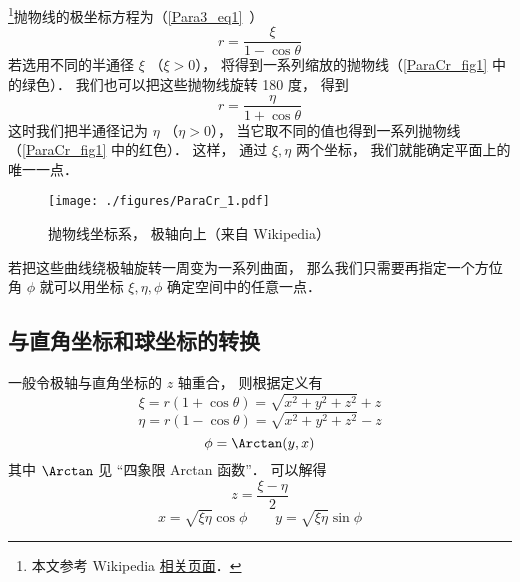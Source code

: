 
\begin{issues}
\issueTODO
\end{issues}


\footnote{本文参考 Wikipedia \href{https://en.wikipedia.org/wiki/Parabolic_coordinates}{相关页面}．}抛物线的极坐标方程为（\autoref{Para3_eq1}~）
\begin{equation}\label{ParaCr_eq1}
r = \frac{\xi}{1 - \cos \theta }
\end{equation}
若选用不同的半通径 $\xi$ （$\xi > 0$）， 将得到一系列缩放的抛物线（\autoref{ParaCr_fig1} 中的绿色）． 我们也可以把这些抛物线旋转 180 度， 得到
\begin{equation}
r = \frac{\eta}{1 + \cos \theta }
\end{equation}
这时我们把半通径记为 $\eta$ （$\eta > 0$）， 当它取不同的值也得到一系列抛物线（\autoref{ParaCr_fig1} 中的红色）． 这样， 通过 $\xi, \eta$ 两个坐标， 我们就能确定平面上的唯一一点．

\begin{figure}[ht]
\centering
\texttt{[image: ./figures/ParaCr\_1.pdf]}
\caption{抛物线坐标系， 极轴向上（来自 Wikipedia）} \label{ParaCr_fig1}
\end{figure}

若把这些曲线绕极轴旋转一周变为一系列曲面， 那么我们只需要再指定一个方位角 $\phi$ 就可以用坐标 $\xi, \eta, \phi$ 确定空间中的任意一点．

\subsection{与直角坐标和球坐标的转换}
一般令极轴与直角坐标的 $z$ 轴重合， 则根据定义有
\begin{equation}
\xi = r(1 + \cos\theta) = \sqrt{x^2 + y^2 + z^2} + z
\end{equation}
\begin{equation}
\eta = r(1 - \cos\theta) = \sqrt{x^2 + y^2 + z^2} - z
\end{equation}
\begin{equation}
\phi = \Arctan(y, x)
\end{equation}
其中 $\Arctan$ 见 “四象限 Arctan 函数”． 可以解得
\begin{equation}\label{ParaCr_eq2}
z = \frac{\xi - \eta}{2}
\end{equation}
\begin{equation}\label{ParaCr_eq3}
x = \sqrt{\xi\eta}\cos\phi \qquad
y = \sqrt{\xi\eta}\sin\phi
\end{equation}


